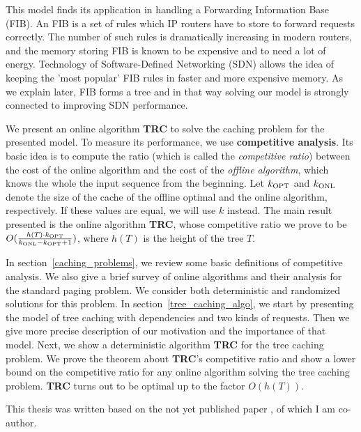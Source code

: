 This model finds its application in handling a Forwarding Information Base (FIB). 
An FIB is a set of rules which IP routers have to store to forward requests
correctly. The number of such rules is dramatically increasing in modern 
routers, and the memory storing FIB is known to be expensive and to need a lot 
of energy. Technology of Software-Defined Networking (SDN) allows the idea 
of keeping the 'most popular' FIB rules in faster and more expensive memory. 
As we explain later, FIB forms a tree and in that way solving our model is strongly
connected to improving SDN performance.

We present an online algorithm \textbf{TRC} to solve the caching problem 
for the presented model. To measure its performance, we use \textbf{competitive 
analysis}. Its basic idea is to compute the ratio (which is called the
\textit{competitive ratio}) between the cost of the online algorithm and the cost of 
the \textit{offline algorithm}, which knows the whole the input sequence from the 
beginning. Let $k_{\mathrm{OPT}}$ and $k_{\mathrm{ONL}}$ denote the size of the cache of the
offline optimal and the online algorithm, respectively. If these values are equal, we
will use $k$ instead. The main result presented is the online algorithm 
\textbf{TRC}, whose competitive ratio we prove to be 
$O(\frac{h(T) \cdot k_{\mathrm{OPT}}}{k_{\mathrm{ONL}} - k_{\mathrm{OPT}} + 1})$, where $h(T)$ is
the height of the tree $T$.

In section~\ref{caching_problems}, we review some basic definitions of competitive
analysis. We also give a brief survey of online algorithms and their analysis 
for the standard paging problem. We consider both deterministic and randomized 
solutions for this problem. In section~\ref{tree_caching_algo}, we start by 
presenting the model of tree caching with dependencies and two kinds of 
requests. Then we give more precise description of our motivation and the importance
of that model. Next, we show a deterministic algorithm \textbf{TRC} for the tree 
caching problem. We prove the theorem about \textbf{TRC}'s  
competitive ratio and show a lower bound on the competitive ratio for any online 
algorithm solving the tree caching problem. \textbf{TRC} turns out to be 
optimal up to the factor $O(h(T))$.

This thesis was written based on the not yet published paper \cite{mypap}, 
of which I am co-author.
